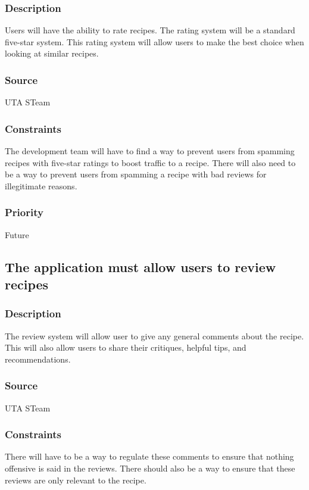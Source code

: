 \subsubsection{Description}
Users will have the ability to rate recipes. The rating system will be a standard five-star system. This rating system will allow users to make the best choice when looking at similar recipes.
\subsubsection{Source}
UTA STeam
\subsubsection{Constraints}
The development team will have to find a way to prevent users from spamming recipes with five-star ratings to boost traffic to a recipe. There will also need to be a way to prevent users from spamming a recipe with bad reviews for illegitimate reasons.
\subsubsection{Priority}
Future

\subsection{The application must allow users to review recipes}
\subsubsection{Description}
The review system will allow user to give any general comments about the recipe. This will also allow users to share their critiques, helpful tips, and recommendations. 
\subsubsection{Source}
UTA STeam
\subsubsection{Constraints}
There will have to be a way to regulate these comments to ensure that nothing offensive is said in the reviews. There should also be a way to ensure that these reviews are only relevant to the recipe.
